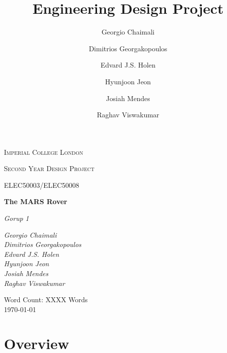 \documentclass[a4paper, table]{article}
\title{Engineering Design Project}
\author{Georgio Chaimali \and Dimitrios Georgakopoulos \and Edvard J.S. Holen 
        \and Hyunjoon Jeon \and Josiah Mendes \and Raghav Viswakumar}
\begin{document}
 
\begin{titlepage}
    \setlength{\headheight}{66.89pt}
    \thispagestyle{fancy}
    \renewcommand{\headrulewidth}{0pt}
    \renewcommand{\footrulewidth}{0pt}
    \cfoot{} %
    \hbox{}\vfill
    \begin{center} 
	    {\scshape\LARGE Imperial College London  \par}
	    \vspace{1cm}
        {\scshape\Large Second Year Design Project\par}
        \vspace{0.25cm}
        {\scshape\Large ELEC50003/ELEC50008\par}
        \vspace{1.5cm}
        {\huge\bfseries The MARS Rover\par}
        \vspace{2cm}
        {\Large\itshape Gorup 1\par}
        \vfill
        \begin{flushright}
            \textsl{ \large
            Georgio Chaimali \\ Dimitrios Georgakopoulos \\ Edvard J.S. Holen 
            \\ Hyunjoon Jeon \\ Josiah Mendes \\ Raghav Viswakumar
            }
        \end{flushright}
        \vfill

        {\large Word Count: XXXX Words \\ \today\par}
    \end{center}
\end{titlepage}
 

\tableofcontents

\newpage

\section{Overview}
\end{document}
